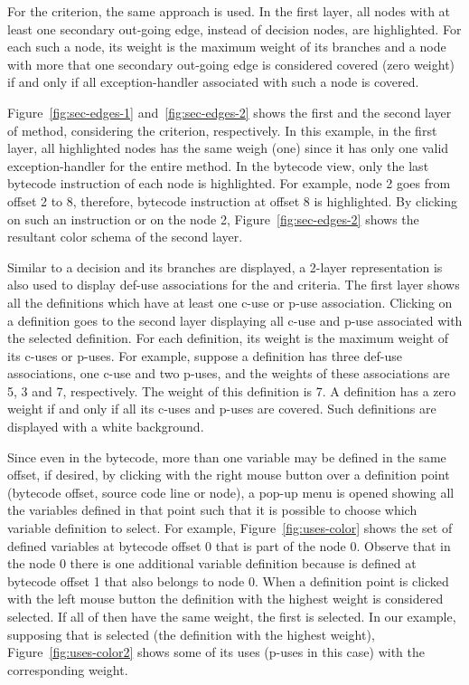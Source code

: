 

For the  criterion, the same approach is used.
In the first layer, all nodes with at least one secondary
out-going edge, instead of decision nodes, are highlighted. For
each such a node, its weight is the maximum weight of its branches
and a node with more that one secondary out-going edge is
considered covered (zero weight) if and only if all
exception-handler associated with such a node is covered.

Figure~\ref{fig:sec-edges-1} and~\ref{fig:sec-edges-2} shows the
first and the second layer of  method,
considering the  criterion, respectively. In
this example, in the first layer, all highlighted nodes has the
same weigh (one) since it has only one valid exception-handler for
the entire method. In the bytecode view, only the last bytecode
instruction of each node is highlighted. For example, node 2 goes
from offset 2 to 8, therefore, bytecode instruction at offset 8
is highlighted. By clicking on such an instruction or on the \DUG
node 2, Figure~\ref{fig:sec-edges-2} shows the resultant color
schema of the second layer.





Similar to a decision and its branches are displayed, a 2-layer
representation is also used to display def-use associations for
the  and  criteria. The first
layer shows all the definitions which have at least one c-use or
p-use association. Clicking on a definition goes to the second
layer displaying all c-use and p-use associated with the selected
definition. For each definition, its weight is the maximum weight
of its c-uses or p-uses. For example, suppose a definition has
three def-use associations, one c-use and two p-uses, and the
weights of these associations are 5, 3 and 7, respectively. The
weight of this definition is 7. A definition has a zero weight if
and only if all its c-uses and p-uses are covered. Such
definitions are displayed with a white background.

Since even in the bytecode, more than one variable may be defined
in the same offset, if desired, by clicking with the right mouse
button over a definition point (bytecode offset, source code line
or \DUG node), a pop-up menu is opened showing all the variables
defined in that point such that it is possible to choose which
variable definition to select. For example,
Figure~\ref{fig:uses-color} shows the set of defined variables at
bytecode offset 0 that is part of the \DUG node 0. Observe that in
the \DUG node 0 there is one additional variable definition
because  is defined at bytecode offset 1 that also
belongs to \DUG node 0. When a definition point is clicked with
the left mouse button the definition with the highest weight is
considered selected. If all of then have the same weight, the
first is selected. In our example, supposing that  is selected (the definition with the highest weight),
Figure~\ref{fig:uses-color2} shows some of its uses (p-uses in
this case) with the corresponding weight.

